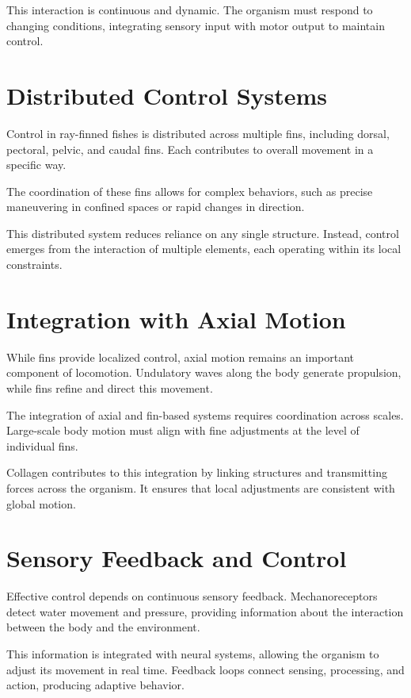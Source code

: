 \documentclass[11pt,oneside]{book}
\begin{document}
This interaction is continuous and dynamic. The organism must respond to changing conditions, integrating sensory input with motor output to maintain control.

\section{Distributed Control Systems}

Control in ray-finned fishes is distributed across multiple fins, including dorsal, pectoral, pelvic, and caudal fins. Each contributes to overall movement in a specific way.

The coordination of these fins allows for complex behaviors, such as precise maneuvering in confined spaces or rapid changes in direction.

This distributed system reduces reliance on any single structure. Instead, control emerges from the interaction of multiple elements, each operating within its local constraints.

\section{Integration with Axial Motion}

While fins provide localized control, axial motion remains an important component of locomotion. Undulatory waves along the body generate propulsion, while fins refine and direct this movement.

The integration of axial and fin-based systems requires coordination across scales. Large-scale body motion must align with fine adjustments at the level of individual fins.

Collagen contributes to this integration by linking structures and transmitting forces across the organism. It ensures that local adjustments are consistent with global motion.

\section{Sensory Feedback and Control}

Effective control depends on continuous sensory feedback. Mechanoreceptors detect water movement and pressure, providing information about the interaction between the body and the environment.

This information is integrated with neural systems, allowing the organism to adjust its movement in real time. Feedback loops connect sensing, processing, and action, producing adaptive behavior.
\end{document}
